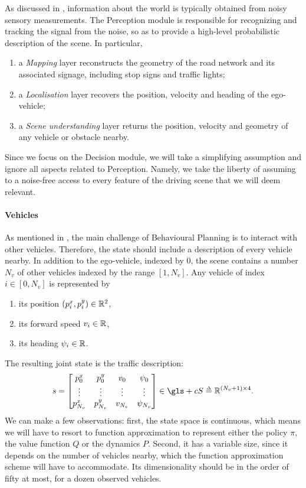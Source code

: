 As discussed in , information about the world is typically obtained from noisy sensory measurements. The Perception module is responsible for recognizing and tracking the signal from the noise, so as to provide a high-level probabilistic description of the scene. In particular, 
\begin{enumerate}[label=(\roman*)]
	\item a \emph{Mapping} layer reconstructs the geometry of the road network and its associated signage, including stop signs and traffic lights;
	\item a \emph{Localisation} layer recovers the position, velocity and heading of the ego-vehicle;
	\item a \emph{Scene understanding} layer returns the position, velocity and geometry of any vehicle or obstacle nearby.
\end{enumerate}

Since we focus on the Decision module, we will take a simplifying assumption and ignore all aspects related to Perception.
Namely, we take the liberty of assuming to a noise-free access to every feature of the driving scene that we will deem relevant.

\paragraph{Vehicles}

As mentioned in , the main challenge of Behavioural Planning is to interact with other vehicles. Therefore, the state should include a description of every vehicle nearby. In addition to the ego-vehicle, indexed by 0, the scene contains a number $N_v$ of other vehicles indexed by the range $[1, N_v]$.
Any vehicle of index $i\in[0,N_v]$ is represented by 
\begin{enumerate}[label=(\roman*)]
	\item its position $(p^x_{i}, p^y_{i})\in\mathbb{R}^2$,
	\item its forward speed $v_i\in\mathbb{R}$, 
	\item its heading $\psi_i\in\mathbb{R}$.
\end{enumerate}

The resulting joint state is the traffic description: 
\begin{equation}
\label{eq:state-space}
s = \begin{bmatrix}
p^x_{0} & p^y_{0} & v_0 & \psi_0\\
\vdots & \vdots & \vdots & \vdots\\
p^x_{{N_v}} & p^y_{{N_v}} & v_{N_v} & \psi_{N_v}\\
\end{bmatrix}
\in\gls+{cS} \eqdef\Real^{(N_v+1) \times 4}.
\end{equation}
We can make a few observations: first, the state space is continuous, which means we will have to resort to function approximation to represent either the policy $\pi$, the value function $Q$ or the dynamics $P$. Second, it has a variable size, since it depends on the number of vehicles nearby, which the function approximation scheme will have to accommodate. Its dimensionality should be in the order of fifty at most, for a dozen observed vehicles.

